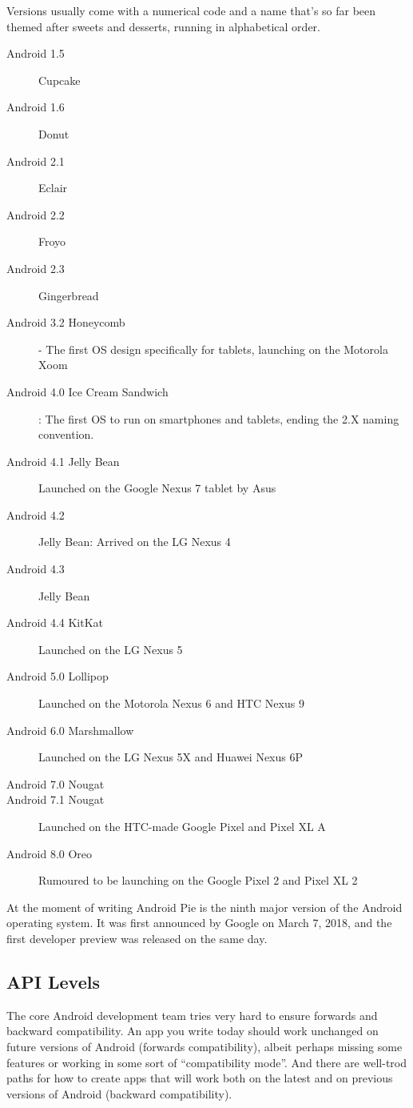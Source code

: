 Versions usually come with a numerical code and a name that’s so far been themed after sweets and desserts, running in alphabetical order.

\begin{description}
	\item[Android 1.5]  Cupcake
	\item[Android 1.6]  Donut
	\item[Android 2.1]  Eclair
	\item[Android 2.2]  Froyo
	\item[Android 2.3]  Gingerbread
	\item[Android 3.2 Honeycomb]  - The first OS design specifically for tablets, launching on the Motorola Xoom
	\item[Android 4.0 Ice Cream Sandwich] : The first OS to run on smartphones and tablets, ending the 2.X naming convention.
	\item[Android 4.1 Jelly Bean]  Launched on the Google Nexus 7 tablet by Asus
	\item[Android 4.2]  Jelly Bean: Arrived on the LG Nexus 4
	\item[Android 4.3]  Jelly Bean
	\item[Android 4.4 KitKat]  Launched on the LG Nexus 5
	\item[Android 5.0 Lollipop]  Launched on the Motorola Nexus 6 and HTC Nexus 9
	\item[Android 6.0 Marshmallow]  Launched on the LG Nexus 5X and Huawei Nexus 6P
	\item[Android 7.0 Nougat] 
	\item[Android 7.1 Nougat]  Launched on the HTC-made Google Pixel and Pixel XL
	A\item[Android 8.0 Oreo] Rumoured to be launching on the Google Pixel 2 and Pixel XL 2
\end{description}

At the moment of writing Android Pie is the ninth major version of the Android operating system.
It was first announced by Google on March 7, 2018, and the first developer preview was released on the same day.

\subsection{API Levels}
The core Android development team tries very hard to ensure forwards and backward compatibility.
An app you write today should work unchanged on future versions of Android (forwards compatibility), albeit perhaps missing some features or working in some sort of “compatibility mode”.
And there are well-trod paths for how to create apps that will work both on the latest and on previous versions of Android (backward compatibility).

